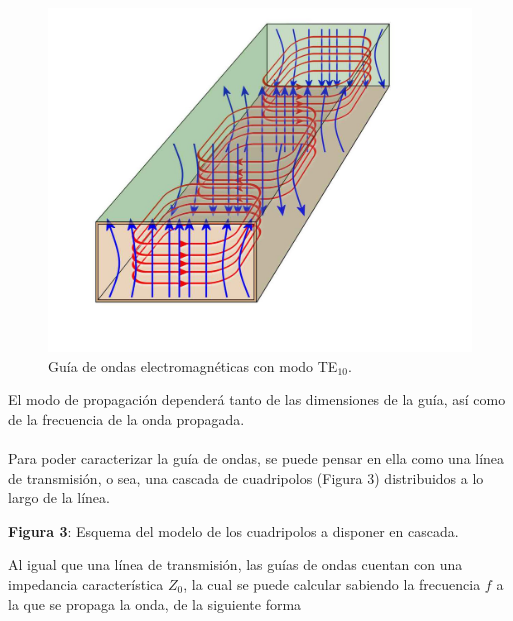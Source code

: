 \documentclass[11pt,a4paper]{article}
\begin{document}
\begin{multicols}{2}
\begin{figure}[H]
    \includegraphics[scale=0.15]{Images/TE10.jpg}
    \caption{Guía de ondas electromagnéticas con modo TE$_{10}$.}
    \label{fig:te10}
\end{figure}

El modo de propagación dependerá tanto de las dimensiones de la guía, así como de la frecuencia de la onda propagada. \\ \\
Para poder caracterizar la guía de ondas, se puede pensar en ella como una línea de transmisión, o sea, una cascada de cuadripolos (Figura 3) distribuidos a lo largo de la línea.
\begin{center}
\textbf{Figura 3}: Esquema del modelo de los cuadripolos a disponer en cascada.
\end{center}
Al igual que una línea de transmisión, las guías de ondas cuentan con una impedancia característica $Z_0$, la cual se puede calcular sabiendo la frecuencia $f$ a la que se propaga la onda, de la siguiente forma


\end{multicols}
\end{document}
